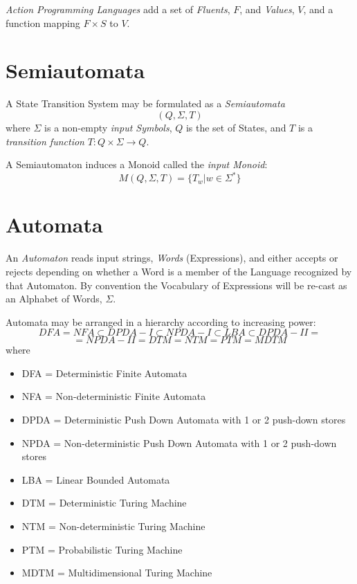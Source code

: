 \documentclass{article}
\begin{document}
\emph{Action Programming Languages} add a set of \emph{Fluents}, $F$, and
\emph{Values}, $V$, and a function mapping $F \times S$ to $V$.

\section{Semiautomata}
A State Transition System may be formulated as a \emph{Semiautomata}
\[
    (Q,\Sigma,T)
\]
where $\Sigma$ is a non-empty \emph{input Symbols}, $Q$ is the set of
States, and $T$ is a \emph{transition function} $T:Q \times \Sigma
\rightarrow Q$.

A Semiautomaton induces a Monoid called the \emph{input Monoid}:
\[
    M(Q,\Sigma,T) = \{T_w | w \in \Sigma^*\}
\]

\section{Automata} \label{subsec:automata}

An \emph{Automaton} reads input strings, \emph{Words} (Expressions),
and either accepts or rejects depending on whether a Word is a member
of the Language recognized by that Automaton. By convention the
Vocabulary of Expressions will be re-cast as an Alphabet of Words,
$\Sigma$.

Automata may be arranged in a hierarchy according to increasing power:
\[
    DFA = NFA \subset DPDA-I \subset NPDA-I \subset LBA \subset DPDA-II =
\]\[
    = NPDA-II = DTM = NTM = PTM = MDTM
\]
where
\begin{itemize}
\item DFA = Deterministic Finite Automata
\item NFA = Non-deterministic Finite Automata
\item DPDA = Deterministic Push Down Automata with 1
  or 2 push-down stores
\item NPDA = Non-deterministic Push Down Automata
  with 1 or 2 push-down stores
\item LBA = Linear Bounded Automata
\item DTM = Deterministic Turing Machine
\item NTM = Non-deterministic Turing Machine
\item PTM = Probabilistic Turing Machine
\item MDTM = Multidimensional Turing Machine
\end{itemize}
\end{document}
